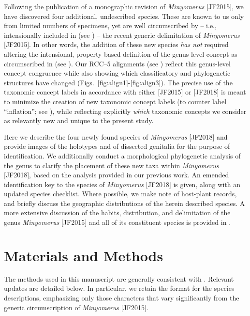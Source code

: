 \documentclass[fleqn,10pt,lineno]{wlpeerj} %
\begin{document}
	Following the publication of a monographic revision of \textit{Minyomerus} [JF2015], we have discovered four additional, undescribed species.
	These are known to us only from limited numbers of specimens, yet are well circumscribed by -- i.e., intensionally included in (see \citealt{fp2009}) -- the recent generic delimitation of \textit{Minyomerus} [JF2015].
	In other words, the addition of these new species \emph{has not} required altering the intensional, property-based definition of the genus-level concept as circumscribed in \citet{jansen2015} (see \textbf{}).
	Our RCC--5 alignments (see \textbf{}) reflect this genus-level concept congruence while also showing which classificatory and phylogenetic structures have changed (Figs.~\ref{fig:align1}-\ref{fig:align3}).
	The precise use of the taxonomic concept labels in accordance with either [JF2015] or [JF2018] is meant to minimize the creation of new taxonomic concept labels (to counter label ``inflation''; see \citet{fp2009}), while reflecting explicitly \emph{which} taxonomic concepts we consider as relevantly new and unique to the present study.
	
	Here we describe the four newly found species of \textit{Minyomerus} [JF2018] and provide images of the holotypes and of dissected genitalia for the purpose of identification.
	We additionally conduct a morphological phylogenetic analysis of the genus to clarify the placement of these new taxa within \textit{Minyomerus} [JF2018], based on the analysis provided in our previous work.
	An emended identification key to the species of \textit{Minyomerus} [JF2018] is given, along with an updated species checklist.
	Where possible, we make note of host-plant records, and briefly discuss the geographic distributions of the herein described species.
	A more extensive discussion of the habits, distribution, and delimitation of the genus \textit{Minyomerus} [JF2015] and all of its constituent species is provided in \citet{jansen2015}.
	
\section*{Materials and Methods}\label{sec:methods} 
	The methods used in this manuscript are generally consistent with \citet{jansen2015}.
	Relevant updates are detailed below. 
	In particular, we retain the format for the species descriptions, emphasizing only those characters that vary significantly from the generic circumscription of \textit{Minyomerus} [JF2015].
\end{document}
